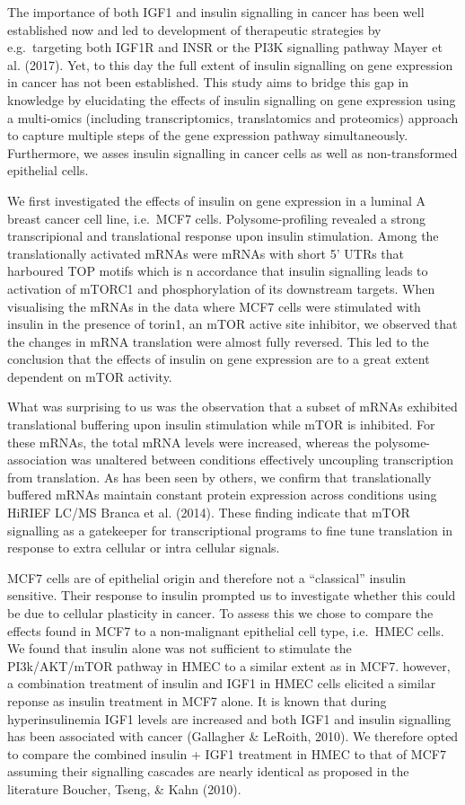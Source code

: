 \documentclass[
  12pt,
  openany]{book}
\begin{document}
The importance of both IGF1 and insulin signalling in cancer has been well established now and led to development of therapeutic strategies by e.g.~targeting both IGF1R and INSR or the PI3K signalling pathway Mayer et al. (2017). Yet, to this day the full extent of insulin signalling on gene expression in cancer has not been established. This study aims to bridge this gap in knowledge by elucidating the effects of insulin signalling on gene expression using a multi-omics (including transcriptomics, translatomics and proteomics) approach to capture multiple steps of the gene expression pathway simultaneously. Furthermore, we asses insulin signalling in cancer cells as well as non-transformed epithelial cells.

We first investigated the effects of insulin on gene expression in a luminal A breast cancer cell line, i.e.~MCF7 cells. Polysome-profiling revealed a strong transcripional and translational response upon insulin stimulation. Among the translationally activated mRNAs were mRNAs with short 5' UTRs that harboured TOP motifs which is n accordance that insulin signalling leads to activation of mTORC1 and phosphorylation of its downstream targets. When visualising the mRNAs in the data where MCF7 cells were stimulated with insulin in the presence of torin1, an mTOR active site inhibitor, we observed that the changes in mRNA translation were almost fully reversed. This led to the conclusion that the effects of insulin on gene expression are to a great extent dependent on mTOR activity.

What was surprising to us was the observation that a subset of mRNAs exhibited translational buffering upon insulin stimulation while mTOR is inhibited. For these mRNAs, the total mRNA levels were increased, whereas the polysome-association was unaltered between conditions effectively uncoupling transcription from translation. As has been seen by others, we confirm that translationally buffered mRNAs maintain constant protein expression across conditions using HiRIEF LC/MS Branca et al. (2014). These finding indicate that mTOR signalling as a gatekeeper for transcriptional programs to fine tune translation in response to extra cellular or intra cellular signals.

MCF7 cells are of epithelial origin and therefore not a ``classical'' insulin sensitive. Their response to insulin prompted us to investigate whether this could be due to cellular plasticity in cancer. To assess this we chose to compare the effects found in MCF7 to a non-malignant epithelial cell type, i.e.~HMEC cells. We found that insulin alone was not sufficient to stimulate the PI3k/AKT/mTOR pathway in HMEC to a similar extent as in MCF7. however, a combination treatment of insulin and IGF1 in HMEC cells elicited a similar reponse as insulin treatment in MCF7 alone. It is known that during hyperinsulinemia IGF1 levels are increased and both IGF1 and insulin signalling has been associated with cancer (Gallagher \& LeRoith, 2010). We therefore opted to compare the combined insulin + IGF1 treatment in HMEC to that of MCF7 assuming their signalling cascades are nearly identical as proposed in the literature Boucher, Tseng, \& Kahn (2010).
\end{document}
